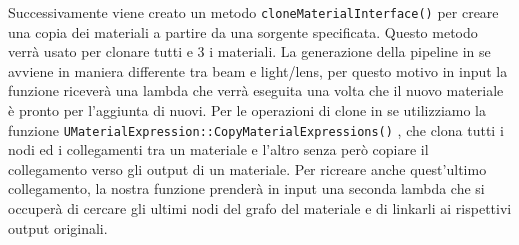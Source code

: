 \documentclass[main.tex]{subfiles}
\begin{document}
Successivamente viene creato un metodo \lstinline{cloneMaterialInterface()} per creare una copia dei materiali a partire da una sorgente specificata. Questo metodo verrà usato per clonare tutti e 3 i materiali. La generazione della pipeline in se avviene in maniera differente tra beam e light/lens, per questo motivo in input la funzione riceverà una lambda che verrà eseguita una volta che il nuovo materiale è pronto per l'aggiunta di nuovi. Per le operazioni di clone in se utilizziamo la funzione \lstinline{UMaterialExpression::CopyMaterialExpressions()} \cite{CopyMaterialExpressions}, che clona tutti i nodi ed i collegamenti tra un materiale e l'altro senza però copiare il collegamento verso gli output di un materiale. Per ricreare anche quest'ultimo collegamento, la nostra funzione prenderà in input una seconda lambda che si occuperà di cercare gli ultimi nodi del grafo del materiale e di linkarli ai rispettivi output originali.
%
%
        
\end{document}
